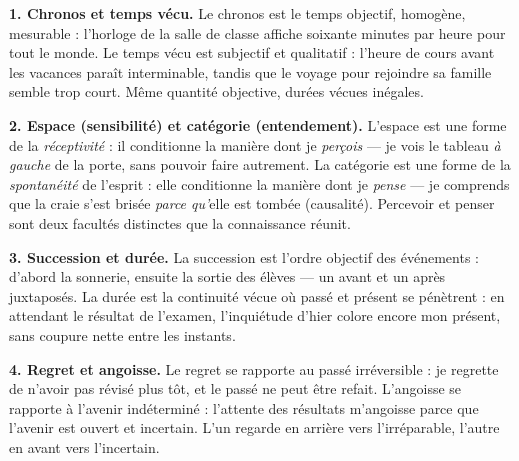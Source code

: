 \documentclass[11pt]{article}
\newcommand{\cle}[1]{{\popxbold\color{popdark}#1}}
\begin{document}
\begin{corrige}

\textbf{1. Chronos et temps vécu.} Le \cle{chronos} est le temps objectif, homogène, mesurable : l'horloge de la salle de classe affiche soixante minutes par heure pour tout le monde. Le \cle{temps vécu} est subjectif et qualitatif : l'heure de cours avant les vacances paraît interminable, tandis que le voyage pour rejoindre sa famille semble trop court. Même quantité objective, durées vécues inégales.

\textbf{2. Espace (sensibilité) et catégorie (entendement).} L'espace est une forme de la \emph{réceptivité} : il conditionne la manière dont je \emph{perçois} — je vois le tableau \emph{à gauche} de la porte, sans pouvoir faire autrement. La catégorie est une forme de la \emph{spontanéité} de l'esprit : elle conditionne la manière dont je \emph{pense} — je comprends que la craie s'est brisée \emph{parce qu'}elle est tombée (causalité). Percevoir et penser sont deux facultés distinctes que la connaissance réunit.

\textbf{3. Succession et durée.} La \cle{succession} est l'ordre objectif des événements : d'abord la sonnerie, ensuite la sortie des élèves — un avant et un après juxtaposés. La \cle{durée} est la continuité vécue où passé et présent se pénètrent : en attendant le résultat de l'examen, l'inquiétude d'hier colore encore mon présent, sans coupure nette entre les instants.

\textbf{4. Regret et angoisse.} Le \cle{regret} se rapporte au passé irréversible : je regrette de n'avoir pas révisé plus tôt, et le passé ne peut être refait. L'\cle{angoisse} se rapporte à l'avenir indéterminé : l'attente des résultats m'angoisse parce que l'avenir est ouvert et incertain. L'un regarde en arrière vers l'irréparable, l'autre en avant vers l'incertain.
\end{corrige}
\end{document}
